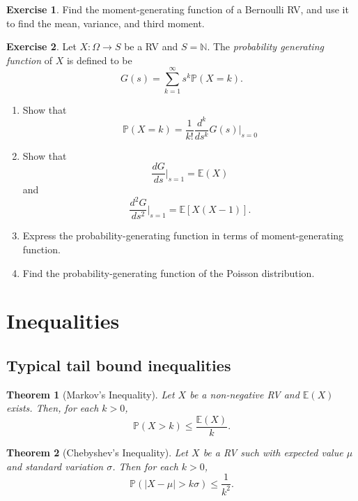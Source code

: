 \documentclass[
  openany]{book}
\newtheorem{theorem}{Theorem}[chapter]
\theoremstyle{definition}
\theoremstyle{definition}
\theoremstyle{definition}
\newtheorem{exercise}{Exercise}[chapter]
\theoremstyle{definition}
\theoremstyle{remark}
\begin{document}
\begin{exercise}
Find the moment-generating function of a Bernoulli RV, and use it to find
the mean, variance, and third moment.
\end{exercise}

\begin{exercise}

Let \(X: \Omega \to S\) be a RV and \(S = \mathbb{N}\).
The \emph{probability generating function} of \(X\) is defined to be
\[ G(s) = \sum_{k=1}^\infty s^k \mathbb{P}(X = k). \]

\begin{enumerate}
\def\labelenumi{\alph{enumi}.}
\item
  Show that
  \[ \mathbb{P}( X = k) = \frac{1}{k!} \frac{d^k}{ds^k} G(s) \vert_{s=0} \]
\item
  Show that
  \[ \frac{dG}{ds} \vert_{s=1} = \mathbb{E}(X) \]
  and
  \[ \frac{d^2G}{ds^2} \vert_{s=1} = \mathbb{E}[X(X-1)]. \]
\item
  Express the probability-generating function in terms of moment-generating function.
\item
  Find the probability-generating function of the Poisson distribution.
\end{enumerate}

\end{exercise}

\section{Inequalities}\label{inequalities}

\subsection{Typical tail bound inequalities}\label{typical-tail-bound-inequalities}

\begin{theorem}[Markov's Inequality]
Let \(X\) be a non-negative RV and \(\mathbb{E}(X)\) exists.
Then, for each \(k >0\),
\[ \mathbb{P}( X > k) \leq \frac{\mathbb{E}(X)}{k}. \]
\end{theorem}

\begin{theorem}[Chebyshev's Inequality]
Let \(X\) be a RV such with expected value \(\mu\) and standard variation \(\sigma\).
Then for each \(k >0\),
\[ \mathbb{P}(| X - \mu | > k \sigma ) \leq \frac{1}{k^2}. \]
\end{theorem}
\end{document}
